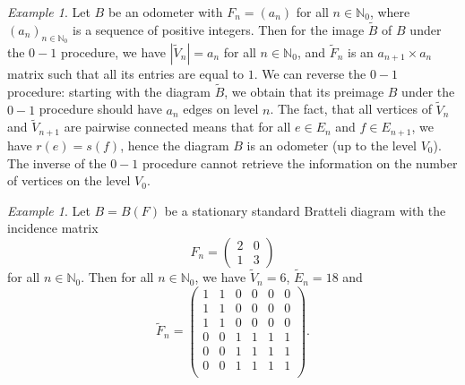 \documentclass[11pt,reqno]{amsart}
\theoremstyle{definition}
\theoremstyle{remark}
\newtheorem{example}[definition]{Example}
\theoremstyle{plain}
\def\tl{\widetilde}
\newcommand{\N}{\mathbb N}
\numberwithin{equation}{section}
\begin{document}
\begin{example}\label{Ex:0-1ProcOdometer}
    Let $B$ be an odometer with $F_n = (a_n)$ for all $n \in \N_0$, where $(a_n)_{n \in \N_0}$ is a sequence of positive integers. Then for the image $\tl B$ of $B$ under the $0-1$ procedure, we have $|\tl V_n| = a_n$ for all $n \in \N_0$, and $\tl F_n$ is an $a_{n+1} \times a_n$ matrix such that all its entries are equal to $1$. 
    We can reverse the $0-1$ procedure: starting with the diagram $\tl B$, we obtain that its preimage $B$ under the $0-1$ procedure should have $a_n$ edges on level $n$. The fact, that all vertices of $\tl V_n$ and $\tl V_{n+1}$ are pairwise connected means that for all $e \in E_n$ and $f \in E_{n+1}$, we have $r(e) = s(f)$, hence the diagram $B$ is an odometer (up to the level $V_0$). The inverse of the $0-1$ procedure cannot retrieve the information on the number of vertices on the level $V_0$. 
\end{example}

\begin{example}
    Let $B = B(F)$ be a stationary standard
Bratteli diagram with the incidence matrix
$$
    F_n = \begin{pmatrix}
        2 & 0 \\
        1 & 3
    \end{pmatrix}
$$
for all $n \in \N_0$. 
Then for all $n \in \N_0$, we have $\tl V_n = 6$, $\tl E_n = 18$ and 
$$
\tl F_n = \begin{pmatrix}
    1 & 1 & 0 & 0 & 0 & 0\\
    1 & 1 & 0 & 0 & 0 & 0\\
    1 & 1 & 0 & 0 & 0 & 0\\
    0 & 0 & 1 & 1 & 1 & 1\\
    0 & 0 & 1 & 1 & 1 & 1\\
    0 & 0 & 1 & 1 & 1 & 1\\
\end{pmatrix}.
$$
\end{example}
\end{document}
